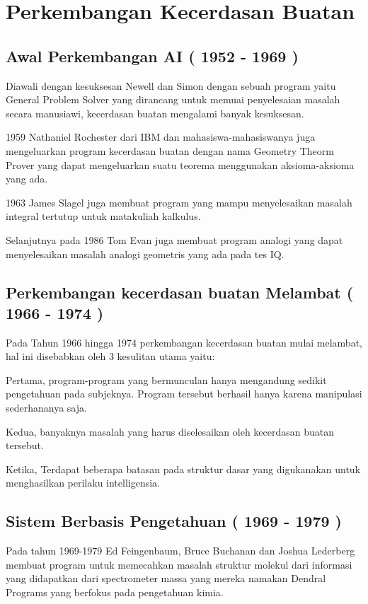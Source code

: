 \documentclass{homework}
\begin{document}
\section{Perkembangan Kecerdasan Buatan}
\subsection{Awal Perkembangan AI ( 1952 - 1969 )}
Diawali dengan kesuksesan Newell dan Simon dengan sebuah program yaitu General Problem Solver yang dirancang untuk memuai penyelesaian masalah secara manusiawi, kecerdasan buatan mengalami banyak kesuksesan.

1959 Nathaniel Rochester dari IBM dan mahasiswa-mahasiswanya juga mengeluarkan program kecerdasan buatan dengan nama Geometry Theorm Prover yang dapat mengeluarkan suatu teorema menggunakan aksioma-aksioma yang ada.

1963 James Slagel juga membuat program yang mampu menyelesaikan masalah integral tertutup untuk matakuliah kalkulus.

Selanjutnya pada 1986 Tom Evan juga membuat program analogi yang dapat menyelesaikan masalah analogi geometris yang ada pada tes IQ.

\subsection{Perkembangan kecerdasan buatan Melambat ( 1966 - 1974 )}
Pada Tahun 1966 hingga 1974 perkembangan kecerdasan buatan mulai melambat, hal ini disebabkan oleh 3 kesulitan utama yaitu:

Pertama, program-program yang bermunculan hanya mengandung sedikit pengetahuan pada subjeknya. Program tersebut berhasil hanya karena manipulasi sederhananya saja.

Kedua, banyaknya masalah yang harus diselesaikan oleh kecerdasan buatan tersebut.

Ketika, Terdapat beberapa batasan pada struktur dasar yang digukanakan untuk menghasilkan perilaku intelligensia.

\subsection{Sistem Berbasis Pengetahuan ( 1969 - 1979 )}
Pada tahun 1969-1979 Ed Feingenbaum, Bruce Buchanan dan Joshua Lederberg membuat program untuk memecahkan masalah struktur molekul dari informasi yang didapatkan dari spectrometer massa yang mereka namakan Dendral Programs yang berfokus pada pengetahuan kimia. 
\end{document}
